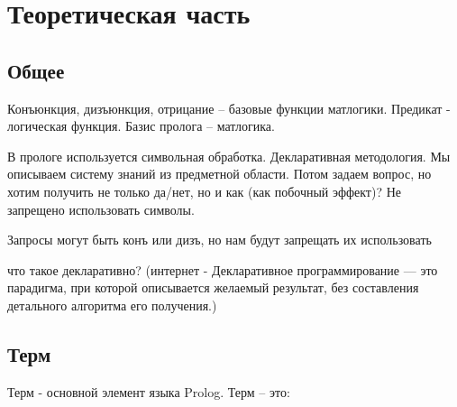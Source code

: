 \documentclass[12pt]{report}
\begin{document}
\chapter{Теоретическая часть}





\section{Общее}
Конъюнкция, дизъюнкция, отрицание  --  базовые функции матлогики. Предикат - логическая функция. Базис пролога -- матлогика.

В прологе используется символьная обработка. Декларативная методология. Мы описываем систему знаний из предметной области. Потом задаем вопрос, но хотим получить не только да/нет, но и как (как побочный эффект)? Не запрещено использовать символы. 


Запросы могут быть конъ или дизъ, но нам будут запрещать их использовать

что такое декларативно? (интернет - Декларативное программирование — это парадигма, при которой описывается желаемый результат, без составления детального алгоритма его получения.)









\section{Терм}

Терм - основной элемент языка Prolog. Терм – это:
\end{document}
